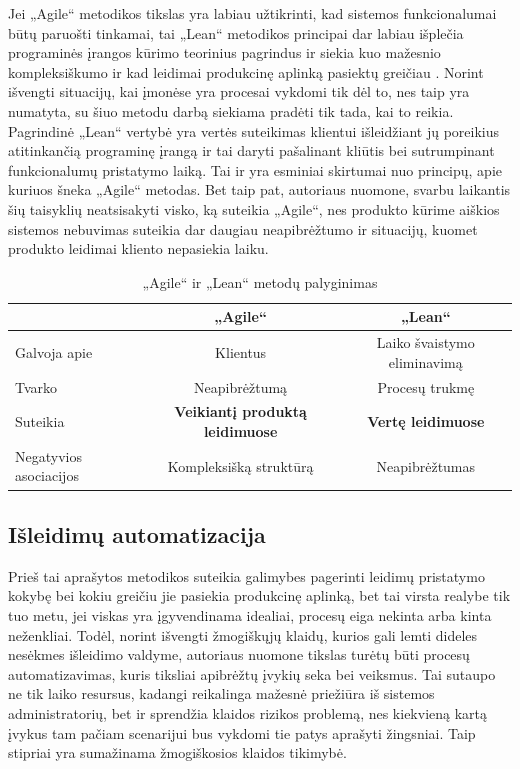 \documentclass{VUMIFPSkursinis}
\begin{document}
Jei „Agile“ metodikos tikslas yra labiau užtikrinti, kad sistemos funkcionalumai būtų paruošti tinkamai, tai „Lean“ metodikos principai dar labiau išplečia programinės įrangos kūrimo teorinius pagrindus ir siekia kuo mažesnio kompleksiškumo ir kad leidimai produkcinę aplinką pasiektų greičiau \cite{SaltSestas}. Norint išvengti situacijų, kai įmonėse yra procesai vykdomi tik dėl to, nes taip yra numatyta, su šiuo metodu darbą siekiama pradėti tik tada, kai to reikia. Pagrindinė „Lean“ vertybė yra vertės suteikimas klientui išleidžiant jų poreikius atitinkančią programinę įrangą ir tai daryti pašalinant kliūtis bei sutrumpinant funkcionalumų pristatymo laiką. Tai ir yra esminiai skirtumai nuo principų, apie kuriuos šneka „Agile“ metodas. Bet taip pat, autoriaus nuomone, svarbu laikantis šių taisyklių neatsisakyti visko, ką suteikia „Agile“, nes produkto kūrime aiškios sistemos nebuvimas suteikia dar daugiau neapibrėžtumo ir situacijų, kuomet produkto leidimai kliento nepasiekia laiku.

\begin{table}[H]\footnotesize
  \centering
  \caption{„Agile“ ir „Lean“ metodų palyginimas}
  {\begin{tabular}{|l|c|c|} \hline
     & „Agile“ & „Lean“ \\
    \hline
    Galvoja apie & Klientus & Laiko švaistymo eliminavimą \\
    \hline
    Tvarko & Neapibrėžtumą & Procesų trukmę       \\
    \hline
    Suteikia & \textbf{Veikiantį produktą leidimuose }  & \textbf{Vertę leidimuose}       \\
    \hline
    Negatyvios asociacijos  & Kompleksišką struktūrą    & Neapibrėžtumas       \\
    \hline
  \end{tabular}}
  \label{tab:table example}
\end{table}

\subsection{Išleidimų automatizacija}

Prieš tai aprašytos metodikos suteikia galimybes pagerinti leidimų pristatymo kokybę bei kokiu greičiu jie pasiekia produkcinę aplinką, bet tai virsta realybe tik tuo metu, jei viskas yra įgyvendinama idealiai, procesų eiga nekinta arba kinta neženkliai. Todėl, norint išvengti žmogiškųjų klaidų, kurios gali lemti dideles nesėkmes išleidimo valdyme, autoriaus nuomone tikslas turėtų būti procesų automatizavimas, kuris tiksliai apibrėžtų įvykių seka bei veiksmus. Tai sutaupo ne tik laiko resursus, kadangi reikalinga mažesnė priežiūra iš sistemos administratorių, bet ir sprendžia klaidos rizikos problemą, nes kiekvieną kartą įvykus tam pačiam scenarijui bus vykdomi tie patys aprašyti žingsniai. Taip stipriai yra sumažinama žmogiškosios klaidos tikimybė.
\end{document}
